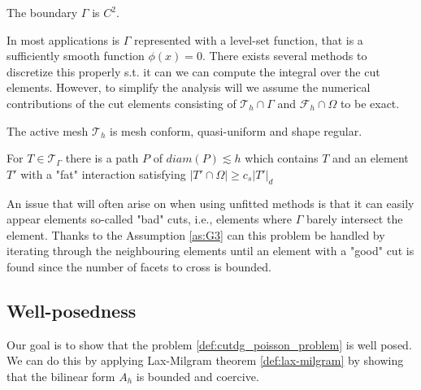 \begin{assumption}[G1]
    \label{as:G1}
    The boundary $\Gamma $ is $C^{2}$.
\end{assumption}

\begin{remark}
In most applications is $\Gamma $ represented with a level-set function, that is a sufficiently smooth function $\phi ( x)  = 0$. There exists several methods to discretize this properly s.t. it can we can compute the integral over the cut elements.
    However, to simplify the analysis will we assume the numerical contributions of the cut elements consisting of $\mathcal{T}_{h} \cap \Gamma   $ and $\mathcal{F}_{h} \cap \Omega  $ to be exact.
\end{remark}


\begin{assumption}[G2]
    \label{as:G2}
   The active mesh $\mathcal{T}_{h} $ is mesh conform, quasi-uniform and shape regular.
\end{assumption}


\begin{assumption}[G3]
    \label{as:G3}
    For $T \in \mathcal{T} _{\Gamma   }$ there is a path $P$ of $diam(P) \lesssim h$ which contains $T$ and an element $T'$ with a "fat" interaction satisfying $\left\lvert T' \cap \Omega  \right\rvert \ge c_{s} \left\lvert T'  \right\rvert _{d}$
\end{assumption}


An issue that will often arise on when using unfitted methods is that it can easily appear elements so-called "bad" cuts, i.e., elements where $\Gamma $ barely intersect the element. Thanks to the Assumption \ref{as:G3} can this problem be handled by
iterating through the neighbouring elements until an element with a "good" cut is found since the number of facets to cross is bounded.




\subsection{Well-posedness}%
\label{sub:well_posedness}

Our goal is to show that the problem \ref{def:cutdg_poisson_problem} is well posed. We can do this by applying Lax-Milgram theorem \ref{def:lax-milgram} by showing that the bilinear form $A_{h}$ is bounded and coercive.


